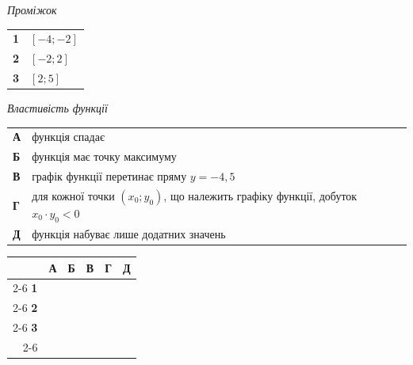 \documentclass[14pt]{extarticle}
\begin{document}
\vspace{0.2cm}

\noindent
\begin{minipage}[t]{0.55\textwidth}
    \vspace{0pt}
    \textit{Проміжок} \par \vspace{0.2cm}
    \begin{tabular}{@{}p{0.5cm} p{3cm}@{}}
    \textbf{1} & $[-4; -2]$ \\[0.3cm]
    \textbf{2} & $[-2; 2]$ \\[0.3cm]
    \textbf{3} & $[2; 5]$ \\
    \end{tabular}
    
    \vspace{0.3cm}
    \textit{Властивість функції} \par \vspace{0.2cm}
    \begin{tabular}{@{}p{0.5cm} p{7cm}@{}}
    \textbf{А} & функція спадає \\[0.2cm]
    \textbf{Б} & функція має точку максимуму \\[0.2cm]
    \textbf{В} & графік функції перетинає пряму $y=-4{,}5$ \\[0.2cm]
    \textbf{Г} & для кожної точки $(x_0; y_0)$, що належить графіку функції, добуток $x_0 \cdot y_0 < 0$ \\[0.2cm]
    \textbf{Д} & функція набуває лише додатних значень \\
    \end{tabular}
    
    \vspace{0.3cm}
    
    \begingroup
    \setlength{\tabcolsep}{4pt}
    \renewcommand{\arraystretch}{1.2}
    \small
    \begin{tabular}{r|c|c|c|c|c|}
         \multicolumn{1}{c}{} & \multicolumn{1}{c}{\textbf{А}} & \multicolumn{1}{c}{\textbf{Б}} & \multicolumn{1}{c}{\textbf{В}} & \multicolumn{1}{c}{\textbf{Г}} & \multicolumn{1}{c}{\textbf{Д}} \\ \cline{2-6}
         \textbf{1} & & & & & \\ \cline{2-6}
         \textbf{2} & & & & & \\ \cline{2-6}
         \textbf{3} & & & & & \\ \cline{2-6}
    \end{tabular}
    \endgroup
\end{minipage}%
\hfill
\end{document}
